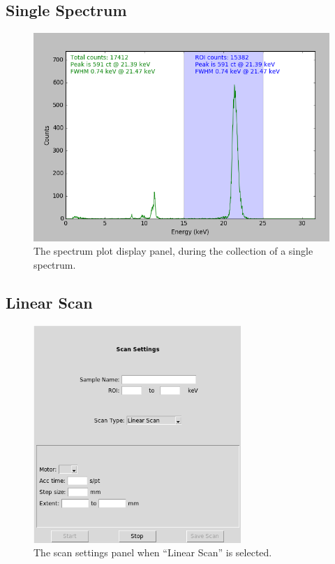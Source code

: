 \subsection{Single Spectrum}

\begin{figure}
\centering
\includegraphics[width=\textwidth]{specplot.png}
\caption{\label{fig:specplot} The spectrum plot display panel, during the collection of a single spectrum.}
\end{figure}



\subsection{Linear Scan}

\begin{figure}
\centering
\includegraphics[width=0.7\textwidth]{linscan.png}
\caption{\label{fig:linscan} The scan settings panel when ``Linear Scan'' is selected.}
\end{figure}

